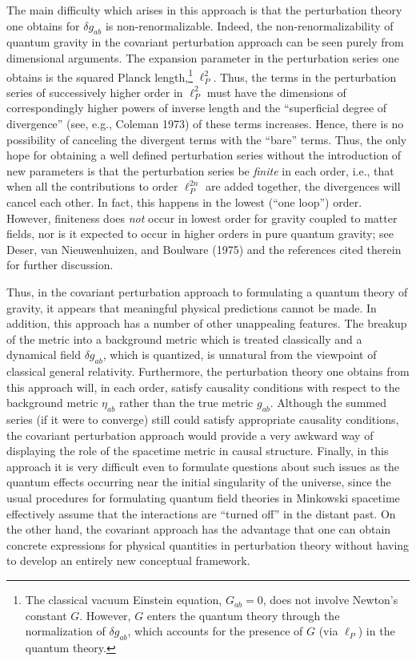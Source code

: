 The main difficulty which arises in this approach is that the perturbation theory one
obtains for \(\delta g_{ab}\) is non-renormalizable. Indeed, the non-renormalizability of quantum
gravity in the covariant perturbation approach can be seen purely from dimensional
arguments. The expansion parameter in the perturbation series one obtains is the
squared Planck length,\footnote{The classical vacuum Einstein equation, \(G_{ab}=0\),
does not involve Newton's constant \(G\). However, \(G\) enters the quantum theory
through the normalization of \(\delta g_{ab}\), which accounts for the presence of
\(G\) (via \(\ell_P\)) in the quantum theory.} \(\ell_P^2\). Thus, the terms in the
perturbation series of successively higher order in \(\ell_P^{2}\) must have the dimensions
of correspondingly higher powers of inverse length and the ``superficial degree of
divergence'' (see, e.g., Coleman 1973) of these terms increases. Hence, there is no
possibility of canceling the divergent terms with the ``bare'' terms. Thus, the only hope
for obtaining a well defined perturbation series without the introduction of new parameters
is that the perturbation series be \emph{finite} in each order, i.e., that when all the
contributions to order \(\ell_P^{2n}\) are added together, the divergences will cancel each
other. In fact, this happens in the lowest (``one loop'') order. However, finiteness does
\emph{not} occur in lowest order for gravity coupled to matter fields, nor is it expected to
occur in higher orders in pure quantum gravity; see Deser, van Nieuwenhuizen, and
Boulware (1975) and the references cited therein for further discussion.

Thus, in the covariant perturbation approach to formulating a quantum theory of
gravity, it appears that meaningful physical predictions cannot be made. In addition,
this approach has a number of other unappealing features. The breakup of the metric
into a background metric which is treated classically and a dynamical field
\(\delta g_{ab}\), which is quantized, is unnatural from the viewpoint of classical general
relativity. Furthermore, the perturbation theory one obtains from this approach will,
in each order, satisfy causality conditions with respect to the background metric
\(\eta_{ab}\) rather than the true metric \(g_{ab}\). Although the summed series (if it were to
converge) still could satisfy appropriate causality conditions, the covariant perturbation
approach would provide a very awkward way of displaying the role of the spacetime
metric in causal structure. Finally, in this approach it is very difficult even to formulate
questions about such issues as the quantum effects occurring near the initial singularity
of the universe, since the usual procedures for formulating quantum field theories in
Minkowski spacetime effectively assume that the interactions are ``turned off'' in the
distant past. On the other hand, the covariant approach has the advantage that one
can obtain concrete expressions for physical quantities in perturbation theory without
having to develop an entirely new conceptual framework.

